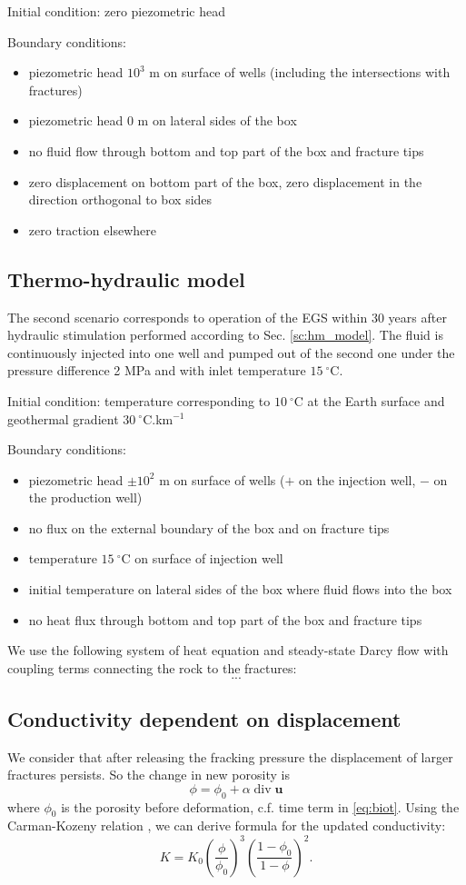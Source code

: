 \documentclass{article}
\renewcommand{\div}{\operatorname{div}}
\newcommand{\vc}[1]{\boldsymbol{#1}}
\begin{document}
Initial condition: zero piezometric head

Boundary conditions:
\begin{itemize}
\item piezometric head $10^3$ m on surface of wells (including the intersections with fractures)
\item piezometric head 0 m on lateral sides of the box
\item no fluid flow through bottom and top part of the box and fracture tips
\item zero displacement on bottom part of the box, zero displacement in the direction orthogonal to box sides
\item zero traction elsewhere
\end{itemize}



\subsection{Thermo-hydraulic model}

The second scenario corresponds to operation of the EGS within 30 years after hydraulic stimulation performed according to Sec. \ref{sc:hm_model}.
The fluid is continuously injected into one well and pumped out of the second one under the pressure difference 2 MPa and with inlet temperature $15\ ^\circ$C.

Initial condition:
temperature corresponding to $10\ ^\circ$C at the Earth surface and geothermal gradient $30\ ^\circ$C.km${}^{-1}$

Boundary conditions:
\begin{itemize}
\item piezometric head $\pm10^2$ m on surface of wells ($+$ on the injection well, $-$ on the production well)
\item no flux on the external boundary of the box and on fracture tips
\item temperature $15\ ^\circ$C on surface of injection well
\item initial temperature on lateral sides of the box where fluid flows into the box
\item no heat flux through bottom and top part of the box and fracture tips
\end{itemize}

We use the following system of heat equation and steady-state Darcy flow with coupling terms connecting the rock to the fractures:
\[ ... \]

\subsection{Conductivity dependent on displacement}
We consider that after releasing the fracking pressure the displacement of larger fractures persists. So the change in new porosity is
\[
\phi = \phi_0 + \alpha\div \vc u
\]
where $\phi_0$ is the porosity before deformation, c.f. time term in \eqref{eq:biot}. 
Using the Carman-Kozeny relation \cite{Kaviany1999}, 
we can derive formula for the updated conductivity:
\[
    K = K_0\left(\frac{\phi}{\phi_0}\right)^3 \left(\frac{1-\phi_0}{1-\phi}\right)^2.
\]
\end{document}
